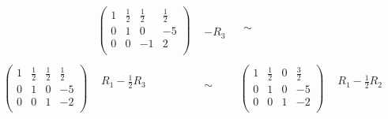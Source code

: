 \documentclass[12pt]{scrartcl}
\begin{document}
\begin{enumerate}
\begin{enumerate}
\begin{equation}
\begin{split}
\begin{array}{cccccc}
					&
					\left(
					\begin{array}{ccc|c}
						1	&	\frac{1}{2}	&	\frac{1}{2}	&	\frac{1}{2} \\
						0	&	1			&	0			&	-5 \\
						0	&	0			&	-1			&	2 \\
					\end{array}
					\right)
					&
					\begin{array}{c}
							\\
								 \\
					-R_3		\\
					\end{array}
										&
					\begin{array}{c}
					 \\
					 \sim\\
					 \\
					\end{array}
					\\
					\\
					\left(
					\begin{array}{ccc|c}
						1	&	\frac{1}{2}	&	\frac{1}{2}	&	\frac{1}{2} \\
						0	&	1			&	0			&	-5 \\
						0	&	0			&	1			&	-2 \\
					\end{array}
					\right)
					&
					\begin{array}{c}
					R_1 - \frac{1}{2}R_3		\\
								 \\
						\\
					\end{array}
										&
					\begin{array}{c}
					 \\
					 \sim\\
					 \\
					\end{array}
					&
					\left(
					\begin{array}{ccc|c}
						1	&	\frac{1}{2}	&	0	&	\frac{3}{2} \\
						0	&	1			&	0			&	-5 \\
						0	&	0			&	1			&	-2 \\
					\end{array}
					\right)
					&
					\begin{array}{c}
					R_1 - \frac{1}{2}R_2		\\
								 \\
						\\

\end{array}
\end{array}
\end{split}
\end{equation}
\end{enumerate}
\end{enumerate}
\end{document}
